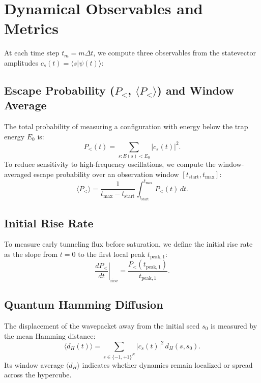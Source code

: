 \documentclass[12pt,a4paper]{report}
\begin{document}
\section{Dynamical Observables and Metrics}
\label{sec:metrics}
At each time step $t_m = m \Delta t$, we compute three observables from the statevector amplitudes $c_s(t) = \langle s | \psi(t) \rangle$:

\subsection{Escape Probability \texorpdfstring{($P_<$, $\langle P_< \rangle$)}{(P\_<)} and Window Average}
The total probability of measuring a configuration with energy below the trap energy $E_0$ is:
\begin{equation}
    P_<(t) = \sum_{s : E(s) < E_0} |c_s(t)|^2.
    \label{eq:p_less}
\end{equation}
To reduce sensitivity to high-frequency oscillations, we compute the window-averaged escape probability over an observation window $[t_{\mathrm{start}}, t_{\max}]$:
\begin{equation}
    \langle P_< \rangle = \frac{1}{t_{\max} - t_{\mathrm{start}}} \int_{t_{\mathrm{start}}}^{t_{\max}} P_<(t) \, dt.
    \label{eq:window_p_less}
\end{equation}

\subsection{Initial Rise Rate}
To measure early tunneling flux before saturation, we define the initial rise rate as the slope from $t = 0$ to the first local peak $t_{\mathrm{peak}, 1}$:
\begin{equation}
    \left. \frac{dP_<}{dt} \right|_{\mathrm{rise}} = \frac{P_<(t_{\mathrm{peak}, 1})}{t_{\mathrm{peak}, 1}}.
    \label{eq:rise_rate}
\end{equation}

\subsection{Quantum Hamming Diffusion}
The displacement of the wavepacket away from the initial seed $s_0$ is measured by the mean Hamming distance:
\begin{equation}
    \langle d_H(t) \rangle = \sum_{s \in \{-1, +1\}^N} |c_s(t)|^2 \, d_H(s, s_0).
    \label{eq:dh_metric}
\end{equation}
Its window average $\langle d_H \rangle$ indicates whether dynamics remain localized or spread across the hypercube.
\end{document}
